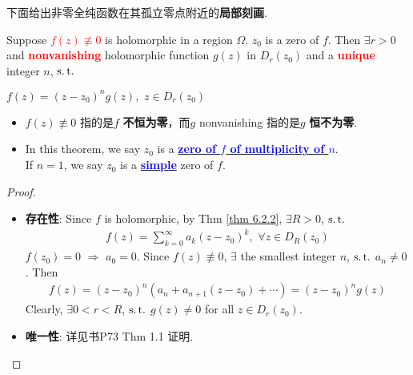 \vspace{2em}
下面给出非零全纯函数在其孤立零点附近的\textbf{局部刻画}.
\begin{thm}\label{thm 7.1.1}
	Suppose \textcolor{red}{\textbf{$f(z) \not\equiv 0$}} is holomorphic in a region $\Omega$. $z_0$ is a zero of $f$. Then $\exists r > 0$ and \textcolor{red}{\textbf{nonvanishing}} holomorphic function $g(z)$ in $D_{r}(z_0)$ and a \textcolor{red}{\textbf{unique}} integer $n$, $\operatorname{s.t.}$
	\begin{center}
		$f(z) = (z - z_0)^n g(z) , \,\, z \in D_{r}(z_0)$
	\end{center}
	
	\vspace{1em}
	\begin{rmk}
		\begin{itemize}
			\item $f(z) \not\equiv 0$ 指的是$f$ \textbf{不恒为零}，而$g$ nonvanishing 指的是$g$ \textbf{恒不为零}.
			
			\item In this theorem, we say $z_0$ is a \underline{\textcolor{blue}{\textbf{zero of $f$ of multiplicity of $n$}}}. \\
			If $n = 1$, we say $z_0$ is a \underline{\textcolor{blue}{\textbf{simple}}} zero of $f$. 
		\end{itemize}
	\end{rmk}
	
	\vspace{1em}
	\begin{proof}
		\begin{itemize}
			\item \textbf{存在性}: Since $f$ is holomorphic, by Thm \ref{thm 6.2.2}, $\exists R > 0$, $\operatorname{s.t.}$
			\begin{align}
				f(z) = \sum_{k = 0}^{\infty}{a_k (z - z_0)^k} , \,\, \forall z \in D_{R}(z_0)
			\end{align}
			$f(z_0) = 0 \,\, \Rightarrow \,\, a_0 = 0$. Since $f(z) \not\equiv 0$, $\exists$ the smallest integer $n$, $\operatorname{s.t.}$ $a_n \neq 0$. Then
			\begin{align}
				f(z) = (z - z_0)^n (a_n + a_{n + 1}(z - z_0) + \cdots) = (z - z_0)^n g(z)
			\end{align}
			Clearly, $\exists 0 < r < R$, $\operatorname{s.t.}$ $g(z) \neq 0$ for all $z \in D_{r}(z_0)$.
			
			\item \textbf{唯一性}: 详见书P73 Thm 1.1 证明.
		\end{itemize}
	\end{proof}
\end{thm}

